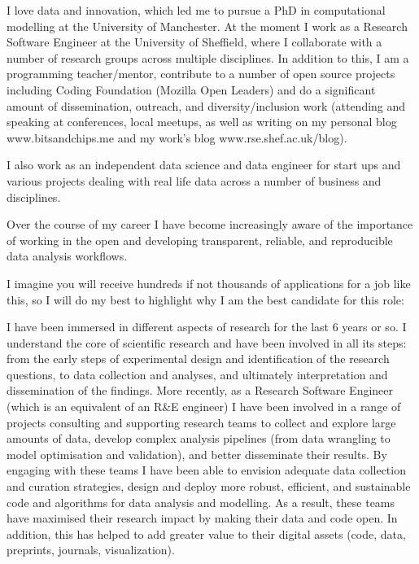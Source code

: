 \documentclass[11pt, a4paper]{awesome-cv} %
\begin{document}
\makecvheader %

\makelettertitle %


\begin{cvletter}


I love data and innovation, which led me to pursue a PhD in computational modelling at the University of Manchester. At the moment I work as a Research Software Engineer at the University of Sheffield, where I collaborate with a number of research groups across multiple disciplines. In addition to this, I am a programming teacher/mentor, contribute to a number of open source projects including Coding Foundation (Mozilla Open Leaders) and do a significant amount of dissemination, outreach, and diversity/inclusion work (attending and speaking at conferences, local meetups, as well as writing on my personal blog www.bitsandchips.me and my work's blog www.rse.shef.ac.uk/blog).

I also work as an independent data science and  data engineer for start ups and various projects dealing with real life data across a number of business and disciplines. 


Over the course of my career I have become increasingly aware of the importance of working in the open and developing transparent, reliable, and reproducible data analysis workflows. 

I imagine you will receive hundreds if not thousands of applications for a job like this, so I will do my best to highlight why I am the best candidate for this role:

I have been immersed in different aspects of research for the last 6 years or so. I understand the core of scientific research and have been involved in all its steps: from the early steps of experimental design and identification of the research questions, to data collection and analyses, and ultimately interpretation and dissemination of the findings. More recently, as a Research Software Engineer (which is an equivalent of an R\&E engineer) I have been involved in a range of projects consulting and supporting research teams to collect and explore large amounts of data, develop complex analysis pipelines (from data wrangling to model optimisation and validation), and better disseminate their results.  By engaging with these teams I have been able to envision adequate data collection and curation strategies, design and deploy more robust, efficient, and sustainable code and algorithms for data analysis and modelling. As a result, these teams have maximised  their research impact by making their data and code open. In addition, this has helped to add greater value to their digital assets (code, data, preprints, journals, visualization).


\end{cvletter}
\end{document}
